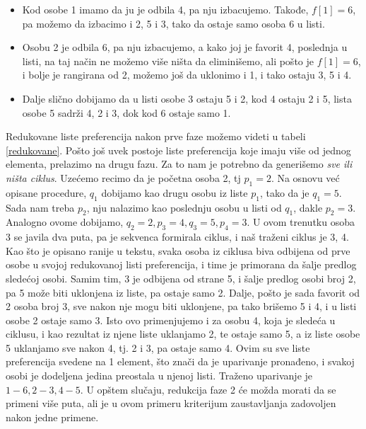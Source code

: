 \documentclass[a4paper]{article}
\begin{document}
\newline
\begin{itemize}
    \item Kod osobe 1 imamo da ju je odbila 4, pa nju izbacujemo. Takođe, $f[1] = 6$, pa možemo da izbacimo i 2, 5 i 3, tako da ostaje samo osoba 6 u listi.
    \item Osobu 2 je odbila 6, pa nju izbacujemo, a kako joj je favorit 4, poslednja u listi, na taj način ne možemo više ništa da eliminišemo, ali pošto je $f[1] = 6$, i bolje je rangirana od 2, možemo još da uklonimo i 1, i tako ostaju 3, 5 i 4.
    \item Dalje slično dobijamo da u listi osobe 3 ostaju 5 i 2, kod 4 ostaju 2 i 5, lista osobe 5 sadrži 4, 2 i 3, dok kod 6 ostaje samo 1.
\end{itemize}
Redukovane liste preferencija nakon prve faze možemo videti u tabeli \ref{redukovane}.
Pošto još uvek postoje liste preferencija koje imaju više od jednog elementa, prelazimo na drugu fazu. Za to nam je potrebno da generišemo \textit{sve ili ništa ciklus}.
Uzećemo recimo da je početna osoba 2, tj $p_1 = 2$. Na osnovu već opisane procedure, $q_1$ dobijamo kao drugu osobu iz liste $p_1$, tako da je $q_1 = 5$. Sada nam treba $p_2$, nju nalazimo kao poslednju osobu u listi od $q_1$, dakle $p_2 = 3$. Analogno ovome dobijamo, $q_2 = 2, p_3 = 4, q_3 = 5, p_4 = 3$. U ovom trenutku osoba 3 se javila dva puta, pa je sekvenca formirala ciklus, i naš traženi ciklus je 3, 4. Kao što je opisano ranije u tekstu, svaka osoba iz ciklusa biva odbijena od prve osobe u svojoj redukovanoj listi preferencija, i time je primorana da šalje predlog sledećoj osobi. Samim tim, 3 je odbijena od strane 5, i šalje predlog osobi broj 2, pa 5 može biti uklonjena iz liste, pa ostaje samo 2. Dalje, pošto je sada favorit od 2 osoba broj 3, sve nakon nje mogu biti uklonjene, pa tako brišemo 5 i 4, i u listi osobe 2 ostaje samo 3.
\newline
Isto ovo primenjujemo i za osobu 4, koja je sledeća u ciklusu, i kao rezultat iz njene liste uklanjamo 2, te ostaje samo 5, a iz liste osobe 5 uklanjamo sve nakon 4, tj. 2 i 3, pa ostaje samo 4. Ovim su sve liste preferencija svedene na 1 element, što znači da je uparivanje pronađeno, i svakoj osobi je dodeljena jedina preostala u njenoj listi. Traženo uparivanje je $1 - 6, 2 - 3, 4 - 5$.
\newline
U opštem slučaju, redukcija faze 2 će možda morati da se primeni više puta, ali je u ovom primeru kriterijum zaustavljanja zadovoljen nakon jedne primene.
\end{document}
